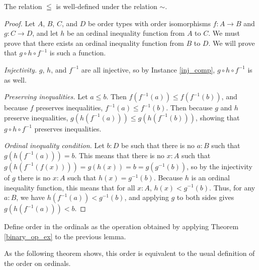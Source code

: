 \documentclass[../../math.tex]{subfiles}
\begin{document}
\begin{lemma}
    The relation $\leqq$ is well-defined under the relation $\sim$.
\end{lemma}
\begin{proof}
    Let $A$, $B$, $C$, and $D$ be order types with order isomorphisms $f : A \to
    B$ and $g : C \to D$, and let $h$ be an ordinal inequality function from $A$
    to $C$.  We must prove that there exists an ordinal inequality function from
    $B$ to $D$.  We will prove that $g \circ h \circ f^{-1}$ is such a function.

    \noindent \textit{Injectivity.}
    $g$, $h$, and $f^{-1}$ are all injective, so by Instance \ref{inj_comp}, $g
    \circ h \circ f^{-1}$ is as well.

    \noindent \textit{Preserving inequalities.}
    Let $a \leq b$.  Then $f(f^{-1}(a)) \leq f(f^{-1}(b))$, and because $f$
    preserves inequalities, $f^{-1}(a) \leq f^{-1}(b)$.  Then because $g$ and
    $h$ preserve inequalities, $g(h(f^{-1}(a))) \leq g(h(f^{-1}(b)))$, showing
    that $g \circ h \circ f^{-1}$ preserves inequalities.

    \noindent \textit{Ordinal inequality condition.}
    Let $b : D$ be such that there is no $a : B$ such that $g(h(f^{-1}(a))) =
    b$.  This means that there is no $x : A$ such that $g(h(f^{-1}(f(x)))) =
    g(h(x)) = b = g(g^{-1}(b))$, so by the injectivity of $g$ there is no $x :
    A$ such that $h(x) = g^{-1}(b)$.  Because $h$ is an ordinal inequality
    function, this means that for all $x : A$, $h(x) < g^{-1}(b)$.  Thus, for
    any $a : B$, we have $h(f^{-1}(a)) < g^{-1}(b)$, and applying $g$ to both
    sides gives $g(h(f^{-1}(a))) < b$.
\end{proof}

\begin{instance}
    Define order in the ordinals as the operation obtained by applying Theorem
    \ref{binary_op_ex} to the previous lemma.
\end{instance}

As the following theorem shows, this order is equivalent to the usual definition
of the order on ordinals.
\end{document}
